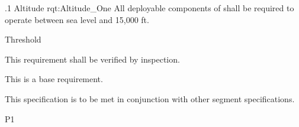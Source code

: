 \ONERQMTVKSA
{\RqtNumberBase.1}
{Altitude}
{rqt:Altitude_One}
{All deployable components of \ThisSys shall be required to operate between sea level and 15,000 ft.}
{
	\item [Phase 1] Threshold
}
{This requirement shall be verified by inspection.}
{
\item [N/A] This is a base requirement.
}
{
	\item This specification is to be met in conjunction with other segment specifications.
}
{P1}

